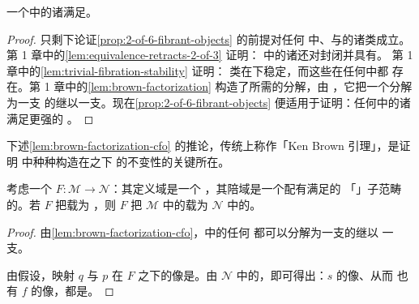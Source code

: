 \begin{corollary}\label{cor:2-of-6}
一个\trInfinityCosmos{}中的诸\trEquivalence{}满足\trTwoOfSixProperty。
\end{corollary}

\begin{proof}
只剩下论证\cref{prop:2-of-6-fibrant-objects} 的前提对任何\trInfinityCosmos{}%
中\trEquivalence{}、\trIsofibration{}与\trTrivialFibration{}的诸类成立。
第 1 章中的\cref{lem:equivalence-retracts-2-of-3} 证明：\trInfinityCosmos{}%
中的诸\trEquivalence{}还对\trRetract{}封闭并具有\trTwoOfThreeProperty。
第 1 章中的\cref{lem:trivial-fibration-stability} 证明：\trTrivialFibration{}%
类在\trPullback{}下稳定，而这些\trPullback{}在任何\trInfinityCosmos{}中都
存在。第 1 章中的\cref{lem:brown-factorization} 构造了所需的分解，由%
\trTwoOfThreeProperty，它把一个\trEquivalence{}分解为一支\trTrivialFibration{}%
的\trSection{}继以一支\trTrivialFibration。现在\cref{prop:2-of-6-fibrant-objects}
便适用于证明：任何\trInfinityCosmos{}中的诸\trEquivalence{}满足更强的%
\trTwoOfSixProperty。
\end{proof}

下述\cref{lem:brown-factorization-cfo} 的推论，传统上称作「Ken Brown 引理」，是证明%
\trCategoryOfFibrantObjects{}中种种\trLimit{}构造在\trPointwise{}\trWeakEquivalence{}之下
的不变性的关键所在。

\begin{lemma}\label{lem:ken-brown}
考虑一个\trFunctor{} $F\colon\mathcal{M}\to\mathcal{N}$：其定义域是一个%
\trCategoryOfFibrantObjects，其陪域是一个配有满足\trTwoOfThreeProperty{}的
「\trWeakEquivalence」子范畴的\trCategory。若 $F$ 把\trTrivialFibration{}载为%
\trWeakEquivalence，则 $F$ 把 $\mathcal{M}$ 中的\trWeakEquivalence{}载为
$\mathcal{N}$ 中的\trWeakEquivalence。
\end{lemma}

\begin{proof}
由\cref{lem:brown-factorization-cfo}，\trCategoryOfFibrantObjects{}中的任何%
\trWeakEquivalence{}都可以分解为一支\trTrivialFibration{}的\trSection{}继以
一支\trTrivialFibration。
\begin{center}
\end{center}
由假设，映射 $q$ 与 $p$ 在 $F$ 之下的像是\trWeakEquivalence。由 $\mathcal{N}$
中\trWeakEquivalence{}的\trTwoOfThreeProperty，即可得出：$s$ 的像、从而
也有 $f$ 的像，都是\trWeakEquivalence。
\end{proof}


